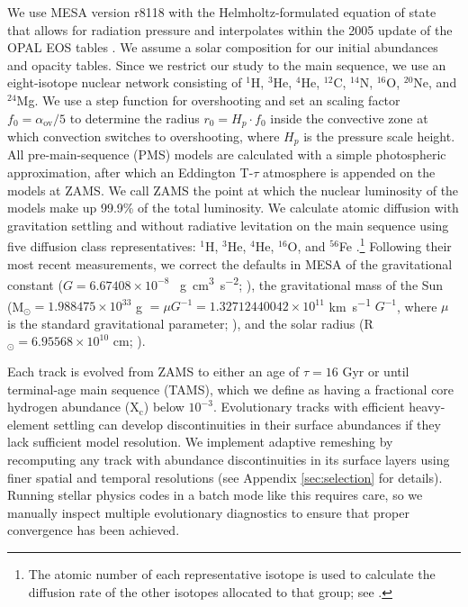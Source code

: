 \documentclass[twocolumn,twocolappendix]{aastex6}
\begin{document}
We use MESA version r8118 with the Helmholtz-formulated equation of state that allows for radiation pressure and interpolates within the 2005 update of the OPAL EOS tables \citep{2002ApJ...576.1064R}. We assume a \citet{1998SSRv...85..161G} solar composition for our initial abundances and opacity tables. Since we restrict our study to the main sequence, we use an eight-isotope nuclear network consisting of $^1$H, $^3$He, $^4$He, $^{12}$C, $^{14}$N, $^{16}$O, $^{20}$Ne, and $^{24}$Mg. We use a step function for overshooting and set an scaling factor $f_0 = \alpha_{\text{ov}}/5$ to determine the radius $r_0 = H_p \cdot f_0$ inside the convective zone at which convection switches to overshooting, where $H_p$ is the pressure scale height. %
All pre-main-sequence (PMS) models are calculated with a simple photospheric approximation, after which an Eddington T-$\tau$ atmosphere is appended on the models at ZAMS. We call ZAMS the point at which the nuclear luminosity of the models make up 99.9\% of the total luminosity. We calculate atomic diffusion with gravitation settling and without radiative levitation on the main sequence using five diffusion class representatives: $^1$H, $^3$He, $^4$He, $^{16}$O, and $^{56}$Fe \citep{burgers1969flow}.\footnote{The atomic number of each representative isotope is used to calculate the diffusion rate of the other isotopes allocated to that group; see \citet{Paxton2011}.} 
Following their most recent measurements, we correct the defaults in MESA of the gravitational constant ($G=6.67408\times 10^{-8}$ \si{\per\g\cm\cubed\per\square\s}; \citealt{2015arXiv150707956M}), the gravitational mass of the Sun (M$_\odot = 1.988475\times 10^{33}$ \si{\g} $= \mu G^{-1} = 1.32712440042\times 10^{11}$ \si{\km\per\s} $G^{-1}$, where $\mu$ is the standard gravitational parameter; \citealt{pitjeva2015determination}), and the solar radius (R$_\odot = 6.95568\times 10^{10}$ \si{\cm}; \citealt{2008ApJ...675L..53H}). 

Each track is evolved from ZAMS to either an age of $\tau=16$ Gyr or until terminal-age main sequence (TAMS), which we define as having a fractional core hydrogen abundance (X$_{\text{c}}$) below $10^{-3}$. Evolutionary tracks with efficient heavy-element settling can develop discontinuities in their surface abundances if they lack sufficient model resolution. We implement adaptive remeshing by recomputing any track with abundance discontinuities in its surface layers using finer spatial and temporal resolutions (see Appendix \ref{sec:selection} for details). Running stellar physics codes in a batch mode like this requires care, so we manually inspect multiple evolutionary diagnostics to ensure that proper convergence has been achieved. %
\end{document}
